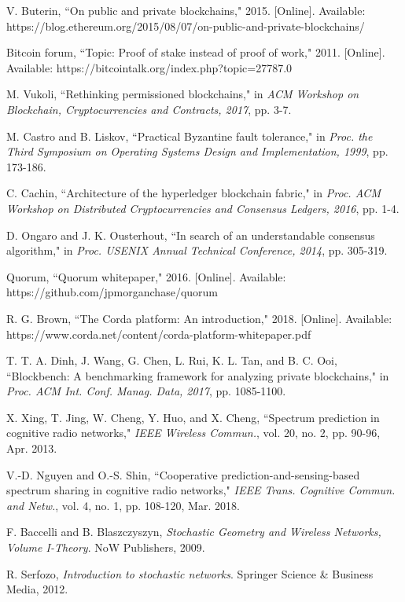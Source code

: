 \documentclass[journal]{IEEEtran}
\begin{document}
\begin{thebibliography}{1}
{ V. Buterin, ``On public and private blockchains," 2015. [Online]. Available: https://blog.ethereum.org/2015/08/07/on-public-and-private-blockchains/
	
 Bitcoin forum, ``Topic: Proof of stake instead of proof of work," 2011. [Online]. Available: https://bitcointalk.org/index.php?topic=27787.0
	
 M. Vukoli, ``Rethinking permissioned blockchains," in \emph{ACM
	Workshop on Blockchain, Cryptocurrencies and Contracts, 2017}, pp. 3-7.
	
 M. Castro and B. Liskov, ``Practical Byzantine fault tolerance," in \emph{Proc. the Third Symposium on Operating Systems Design and Implementation, 1999}, pp. 173-186.
	
 C. Cachin, ``Architecture of the hyperledger blockchain fabric," in \emph{Proc. ACM Workshop on Distributed Cryptocurrencies and Consensus Ledgers, 2016}, pp. 1-4.
	
 D. Ongaro and J. K. Ousterhout, ``In search of an understandable consensus algorithm," in \emph{Proc. USENIX Annual Technical Conference, 2014}, pp. 305-319.
	
 Quorum, ``Quorum whitepaper," 2016. [Online]. Available: https://github.com/jpmorganchase/quorum
	
  R. G. Brown, ``The Corda platform: An introduction," 2018. [Online]. Available: https://www.corda.net/content/corda-platform-whitepaper.pdf

  T. T. A. Dinh, J. Wang, G. Chen, L. Rui, K. L. Tan, and B. C. Ooi, ``Blockbench: A benchmarking framework for analyzing private blockchains," in \emph{Proc. ACM Int. Conf. Manag. Data, 2017}, pp. 1085-1100.

 X. Xing, T. Jing, W. Cheng, Y. Huo, and X. Cheng, ``Spectrum prediction in cognitive radio networks," \emph{IEEE Wireless Commun.},  vol. 20, no. 2, pp. 90-96, Apr. 2013.

 V.-D. Nguyen and O.-S. Shin, ``Cooperative prediction-and-sensing-based spectrum sharing in cognitive radio networks," \emph{IEEE Trans. Cognitive Commun. and Netw.},  vol. 4, no. 1, pp. 108-120, Mar. 2018.

 F. Baccelli and B. Blaszczyszyn, \emph{Stochastic Geometry and Wireless Networks, Volume I-Theory}. NoW Publishers, 2009.
	
 R. Serfozo, \emph{Introduction to stochastic networks}. Springer Science \& Business Media, 2012.
	
}
\end{thebibliography}
\end{document}
